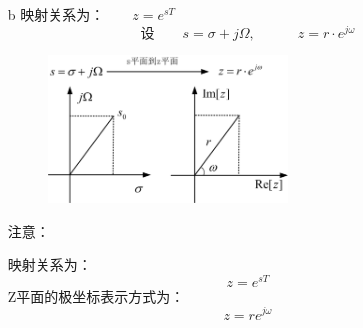 \documentclass[notheorems,compress,mathserif,table]{beamer}
\begin{document}
\begin{frame}[shrink]\frametitle{}%
\begin{enumerate}
\item [b]映射关系为：$\quad\quad z=e^{sT}$
    $$\mbox{设}\quad\quad s=\sigma + j\Omega, \quad\quad\quad z=r\cdot e^{j\omega}$$
    \begin{figure}[h]
        \centering
        \includegraphics[width=0.6\textwidth]{fig14_MZzhijiaojizuobiao.jpg}
    \end{figure}
    注意：\par
    映射关系为：
    $$z=e^{sT}$$
    Z平面的极坐标表示方式为：
    $$z=re^{j\omega}$$

\end{enumerate}

\end{frame}
%
%
\end{document}
